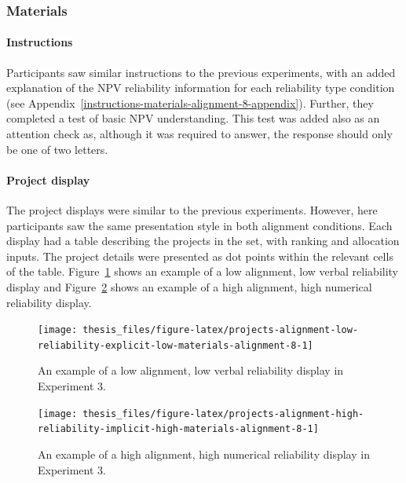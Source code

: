 \documentclass[a4paper, nobind, dvipsnames]{templates/ociamthesis}
\theoremstyle{definition}
\theoremstyle{definition}
\theoremstyle{definition}
\theoremstyle{definition}
\theoremstyle{remark}
\begin{document}
\hypertarget{materials-3}{%
\subsubsection{Materials}\label{materials-3}}

\hypertarget{instructions-2}{%
\paragraph{Instructions}\label{instructions-2}}

Participants saw similar instructions to the previous experiments, with an added
explanation of the NPV reliability information for each reliability type
condition (see Appendix~\ref{instructions-materials-alignment-8-appendix}). Further, they
completed a test of basic NPV understanding. This test was added also as an
attention check as, although it was required to answer, the response should only
be one of two letters.

\hypertarget{project-display-1}{%
\paragraph{Project display}\label{project-display-1}}

The project displays were similar to the previous experiments. However, here
participants saw the same presentation style in both alignment conditions. Each
display had a table describing the projects in the set, with ranking and
allocation inputs. The project details were presented as dot points within the
relevant cells of the table.
Figure~\ref{fig:projects-alignment-low-reliability-explicit-low-materials-alignment-8}
shows an example of a low alignment, low verbal reliability display and
Figure~\ref{fig:projects-alignment-high-reliability-implicit-high-materials-alignment-8}
shows an example of a high alignment, high numerical reliability display.



\begin{figure}
\texttt{[image: thesis\_files/figure-latex/projects-alignment-low-reliability-explicit-low-materials-alignment-8-1]} \caption{An example of a low alignment, low verbal reliability display in Experiment 3.}\label{fig:projects-alignment-low-reliability-explicit-low-materials-alignment-8}
\end{figure}



\begin{figure}
\texttt{[image: thesis\_files/figure-latex/projects-alignment-high-reliability-implicit-high-materials-alignment-8-1]} \caption{An example of a high alignment, high numerical reliability display in Experiment 3.}\label{fig:projects-alignment-high-reliability-implicit-high-materials-alignment-8}
\end{figure}
\end{document}
